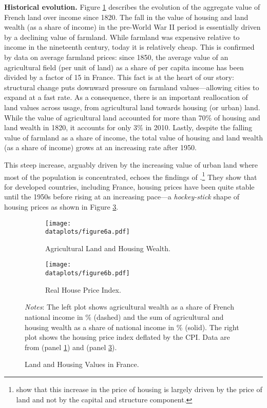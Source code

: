 \documentclass[./20250130-paper.tex]{subfiles}
\begin{document}
\textbf{Historical evolution.} Figure \ref{fig:pikettywealth} describes the evolution of the aggregate value of French land over income since 1820. The fall in the value of housing and land wealth (as a share of income) in the pre-World War II period is essentially driven by a declining value of farmland. While farmland was expensive relative to income in the nineteenth century, today it is relatively cheap. This is confirmed by data on average farmland prices: since 1850, the average value of an agricultural field (per unit of land) as a share of per capita income has been divided by a factor of 15 in France. This fact is at the heart of our story: structural change puts downward pressure on farmland values---allowing cities to expand at a fast rate. As a consequence, there is an important reallocation of land values across usage, from agricultural land towards housing (or urban) land. While the value of agricultural land accounted for more than 70\% of housing and land wealth in 1820, it accounts for only 3\% in 2010. Lastly, despite the falling value of farmland as a share of income, the total value of housing and land wealth (as a share of income) grows at an increasing rate after 1950. 



This steep increase, arguably driven by the increasing value of urban land where most of the population is concentrated, echoes the findings of \cite{knoll2017no}.\footnote{\cite{bonnet2019} show that this increase in the price of housing is largely driven by the price of land and not by the capital and structure component.} They show that for developed countries, including France, housing prices have been quite stable until the 1950s before rising at an increasing pace---a \emph{hockey-stick} shape of housing prices as shown in Figure \ref{fig:real-hpi-knoll}.



\begin{figure}[h]
	\begin{subfigure}{0.5\textwidth}
		\texttt{[image: \\dataplots/figure6a.pdf]}
		\caption{Agricultural Land and Housing Wealth.\label{fig:pikettywealth}}
	\end{subfigure}%
	\hspace{5mm}
	\begin{subfigure}{0.5\textwidth}
		\texttt{[image: \\dataplots/figure6b.pdf]}
		\caption{Real House Price Index.\label{fig:real-hpi-knoll}}
	\end{subfigure}
	\caption{Land and Housing Values in France.}
	{\footnotesize \textit{Notes}: The left plot shows agricultural wealth as a share of French national income in \% (dashed) and the sum of agricultural and housing wealth as a share of national income in \% (solid). The right plot shows the housing price index deflated by the CPI. Data are from \cite{piketty2014capital} (panel \ref{fig:pikettywealth}) and \cite{knoll2017no} (panel \ref{fig:real-hpi-knoll}).}
\end{figure}
\end{document}
